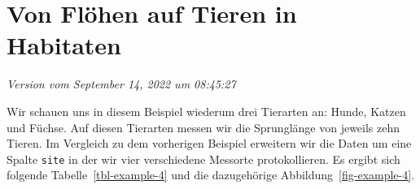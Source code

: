 \documentclass[
  letterpaper,
]{scrbook}
\begin{document}
\hypertarget{sec-example-4}{%
\chapter{Von Flöhen auf Tieren in Habitaten}\label{sec-example-4}}

\emph{Version vom September 14, 2022 um 08:45:27}

Wir schauen uns in diesem Beispiel wiederum drei Tierarten an: Hunde,
Katzen und Füchse. Auf diesen Tierarten messen wir die Sprunglänge von
jeweils zehn Tieren. Im Vergleich zu dem vorherigen Beispiel erweitern
wir die Daten um eine Spalte \texttt{site} in der wir vier verschiedene
Messorte protokollieren. Es ergibt sich folgende
Tabelle~\ref{tbl-example-4} und die dazugehörige
Abbildung~\ref{fig-example-4}.

\hypertarget{tbl-example-4}{}
\end{document}
